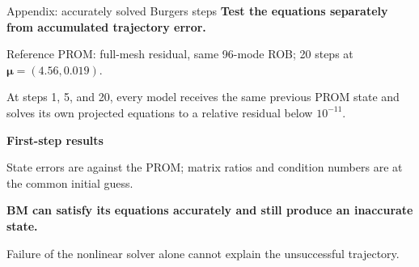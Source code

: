 \documentclass[aspectratio=169]{beamer}
\newcommand{\vect}[1]{\boldsymbol{#1}}
\begin{document}
\begin{frame}{Appendix: accurately solved Burgers steps}
\hypertarget{bmecsw-burgers-step-accuracy}{}
\fontsize{9}{10.5}\selectfont
\setlength{\parskip}{0pt}
\textbf{Test the equations separately from accumulated trajectory error.}\par
\vspace{5pt}
Reference PROM: full-mesh residual, same 96-mode ROB; 20 steps at $\vect{\mu}=(4.56,0.019)$.\par
\vspace{5pt}
At steps 1, 5, and 20, every model receives the same previous PROM state and solves its own projected equations to a relative residual below $10^{-11}$.\par
\vspace{6pt}
\textbf{First-step results}\par
\vspace{4pt}
\begingroup
\centering\rmfamily
\fontsize{8.5}{10}\selectfont
\setlength{\tabcolsep}{5pt}
\renewcommand{\arraystretch}{1.12}
\par
\endgroup
\vspace{4pt}
{\fontsize{8}{9}\selectfont State errors are against the PROM; matrix ratios and condition numbers are at the common initial guess.}\par
\vspace{7pt}
\textbf{BM can satisfy its equations accurately and still produce an inaccurate state.}\par
Failure of the nonlinear solver alone cannot explain the unsuccessful trajectory.\par
\vfill\hfill\hyperlink{bmecsw-burgers-evidence}{}
\end{frame}
\end{document}

